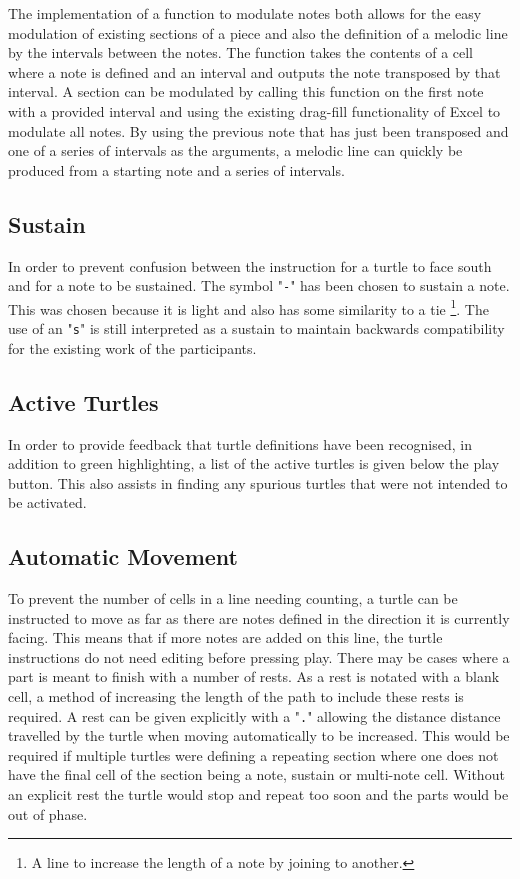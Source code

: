 The implementation of a function to modulate notes both allows for the easy modulation of existing sections of a piece and also the definition of a melodic line by the intervals between the notes. The function takes the contents of a cell where a note is defined and an interval and outputs the note transposed by that interval. A section can be modulated by calling this function on the first note with a provided interval and using the existing drag-fill functionality of Excel to modulate all notes. By using the previous note that has just been transposed and one of a series of intervals as the arguments, a melodic line can quickly be produced from a starting note and a series of intervals.


\subsection{Sustain}

In order to prevent confusion between the instruction for a turtle to face south and for a note to be sustained. The symbol "\texttt{-}" has been chosen to sustain a note. This was chosen because it is light and also has some similarity to a tie \footnote{A line to increase the length of a note by joining to another.}. The use of an "\texttt{s}" is still interpreted as a sustain to maintain backwards compatibility for the existing work of the participants.

\subsection{Active Turtles}

In order to provide feedback that turtle definitions have been recognised, in addition to green highlighting, a list of the active turtles is given below the play button. This also assists in finding any spurious turtles that were not intended to be activated.

\subsection{Automatic Movement}

To prevent the number of cells in a line needing counting, a turtle can be instructed to move as far as there are notes defined in the direction it is currently facing. This means that if more notes are added on this line, the turtle instructions do not need editing before pressing play. There may be cases where a part is meant to finish with a number of rests. As a rest is notated with a blank cell, a method of increasing the length of the path to include these rests is required. A rest can be given explicitly with a "\texttt{.}" allowing the distance distance travelled by the turtle when moving automatically to be increased. This would be required if multiple turtles were defining a repeating section where one does not have the final cell of the section being a note, sustain or multi-note cell. Without an explicit rest the turtle would stop and repeat too soon and the parts would be out of phase.


